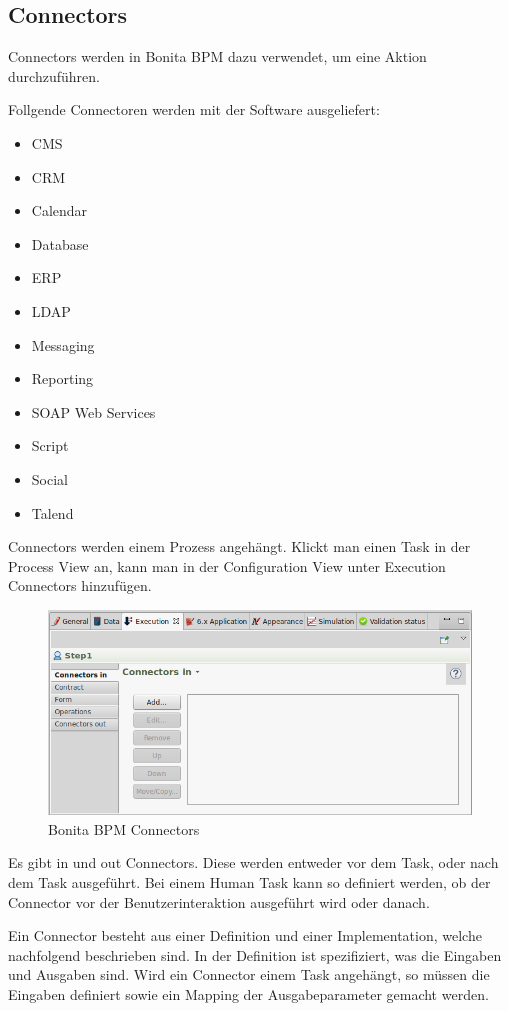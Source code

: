 \subsection{Connectors}
\label{sec:analyse:bonita:connectors}
Connectors werden in Bonita BPM dazu verwendet, um eine Aktion durchzuführen. 

Follgende Connectoren werden mit der Software ausgeliefert:
\begin{itemize}
\item CMS
\item CRM
\item Calendar
\item Database
\item ERP
\item LDAP
\item Messaging
\item Reporting
\item SOAP Web Services
\item Script
\item Social
\item Talend
\end{itemize}

Connectors werden einem Prozess angehängt. Klickt man einen Task in der Process View an, kann man in der Configuration View unter Execution Connectors hinzufügen.
\begin{figure}[H]
	\centering
	\includegraphics[width=1\textwidth]{images/bonita-connectors.png}
	\caption{Bonita BPM Connectors}
	\label{fig:analyse:bonita:connectors}
\end{figure}
Es gibt in und out Connectors. Diese werden entweder vor dem Task, oder nach dem Task ausgeführt. Bei einem Human Task kann so definiert werden, ob der Connector vor der Benutzerinteraktion ausgeführt wird oder danach.

Ein Connector besteht aus einer Definition und einer Implementation, welche nachfolgend beschrieben sind. In der Definition ist spezifiziert, was die Eingaben und Ausgaben sind. Wird ein Connector einem Task angehängt, so müssen die Eingaben definiert sowie ein Mapping der Ausgabeparameter gemacht werden.


